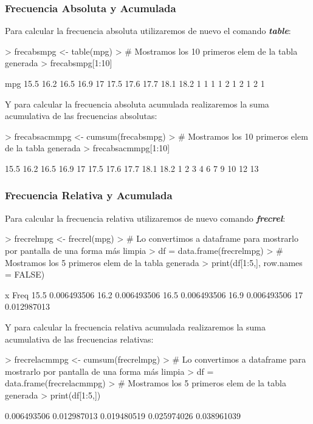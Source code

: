 \documentclass [a4paper] {article}
\begin{document}
\subsubsection{Frecuencia Absoluta y Acumulada}
Para calcular la frecuencia absoluta utilizaremos de nuevo el comando \textbf{\textit{table}}:
\begin{Schunk}
\begin{Sinput}
> frecabsmpg <- table(mpg)
> # Mostramos los 10 primeros elem de la tabla generada
> frecabsmpg[1:10]
\end{Sinput}
\begin{Soutput}
mpg
15.5 16.2 16.5 16.9   17 17.5 17.6 17.7 18.1 18.2 
   1    1    1    1    2    1    2    1    2    1 
\end{Soutput}
\end{Schunk}
Y para calcular la frecuencia absoluta acumulada realizaremos la suma acumulativa de las frecuencias absolutas:
\begin{Schunk}
\begin{Sinput}
> frecabsacmmpg <- cumsum(frecabsmpg)
> # Mostramos los 10 primeros elem de la tabla generada
> frecabsacmmpg[1:10]
\end{Sinput}
\begin{Soutput}
15.5 16.2 16.5 16.9   17 17.5 17.6 17.7 18.1 18.2 
   1    2    3    4    6    7    9   10   12   13 
\end{Soutput}
\end{Schunk}

\subsubsection{Frecuencia Relativa y Acumulada}
Para calcular la frecuencia relativa utilizaremos de nuevo comando \textbf{\textit{frecrel}}:
\begin{Schunk}
\begin{Sinput}
> frecrelmpg <- frecrel(mpg)
> # Lo convertimos a dataframe para mostrarlo por pantalla de una forma más limpia
> df = data.frame(frecrelmpg)
> # Mostramos los 5 primeros elem de la tabla generada
> print(df[1:5,], row.names = FALSE)
\end{Sinput}
\begin{Soutput}
    x        Freq
 15.5 0.006493506
 16.2 0.006493506
 16.5 0.006493506
 16.9 0.006493506
   17 0.012987013
\end{Soutput}
\end{Schunk}
\newpage
Y para calcular la frecuencia relativa acumulada realizaremos la suma acumulativa de las frecuencias relativas:
\begin{Schunk}
\begin{Sinput}
> frecrelacmmpg <- cumsum(frecrelmpg)
> # Lo convertimos a dataframe para mostrarlo por pantalla de una forma más limpia
> df = data.frame(frecrelacmmpg)
> # Mostramos los 5 primeros elem de la tabla generada
> print(df[1:5,])
\end{Sinput}
\begin{Soutput}
[1] 0.006493506 0.012987013 0.019480519 0.025974026 0.038961039
\end{Soutput}
\end{Schunk}
\end{document}
